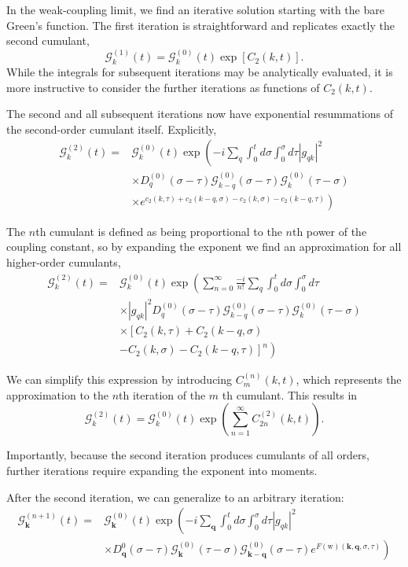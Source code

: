 In the weak-coupling limit, we find an iterative solution starting with the bare Green's function. The first iteration is straightforward and replicates exactly the second cumulant,
$$
\mathcal{G}_k^{(1)}(t)=\mathcal{G}_k^{(0)}(t) \exp \left[C_2(k, t)\right] .
$$
While the integrals for subsequent iterations may be analytically evaluated, it is more instructive to consider the further iterations as functions of $C_2(k, t)$.

The second and all subsequent iterations now have exponential resummations of the second-order cumulant itself. Explicitly,
$$
\begin{aligned}
\mathcal{G}_k^{(2)}(t)= & \mathcal{G}_k^{(0)}(t) \exp \left(-i \sum_q \int_0^t d \sigma \int_0^\sigma d \tau\left|g_{q k}\right|^2\right. \\
& \times D_q^{(0)}(\sigma-\tau) \mathcal{G}_{k-q}^{(0)}(\sigma-\tau) \mathcal{G}_k^{(0)}(\tau-\sigma) \\
& \left.\times e^{c_2(k, \tau)+c_2(k-q, \sigma)-c_2(k, \sigma)-c_2(k-q, \tau)}\right)
\end{aligned}
$$

The $n$th cumulant is defined as being proportional to the $n$th power of the coupling constant, so by expanding the exponent we find an approximation for all higher-order cumulants,
$$
\begin{aligned}
\mathcal{G}_k^{(2)}(t)= & \mathcal{G}_k^{(0)}(t) \exp \left(\sum_{n=0}^{\infty} \frac{-i}{n!} \sum_q \int_0^t d \sigma \int_0^\sigma d \tau\right. \\
& \times\left|g_{q k}\right|^2 D_q^{(0)}(\sigma-\tau) \mathcal{G}_{k-q}^{(0)}(\sigma-\tau) \mathcal{G}_k^{(0)}(\tau-\sigma) \\
& \times\left[C_2(k, \tau)+C_2(k-q, \sigma)\right. \\
& \left.\left.-C_2(k, \sigma)-C_2(k-q, \tau)\right]^n\right)
\end{aligned}
$$

We can simplify this expression by introducing $C_m^{(n)}(k, t)$, which represents the approximation to the $n$th iteration of the $m$ th cumulant. This results in
$$
\mathcal{G}_k^{(2)}(t)=\mathcal{G}_k^{(0)}(t) \exp \left(\sum_{n=1}^{\infty} C_{2 n}^{(2)}(k, t)\right) .
$$

Importantly, because the second iteration produces cumulants of all orders, further iterations require expanding the exponent into moments.

After the second iteration, we can generalize to an arbitrary iteration:
$$
\begin{aligned}
\mathcal{G}_{\mathbf{k}}^{(n+1)}(t)= & \mathcal{G}_{\mathbf{k}}^{(0)}(t) \exp \left(-i \sum_{\mathbf{q}} \int_0^t d \sigma \int_0^\sigma d \tau\left|g_{q k}\right|^2\right. \\
& \left.\times D_{\mathbf{q}}^0(\sigma-\tau) \mathcal{G}_{\mathbf{k}}^{(0)}(\tau-\sigma) \mathcal{G}_{\mathbf{k}-\mathbf{q}}^{(0)}(\sigma-\tau) e^{F(\mathrm{w})(\mathbf{k}, \mathbf{q}, \sigma, \tau)}\right)
\end{aligned}
$$

